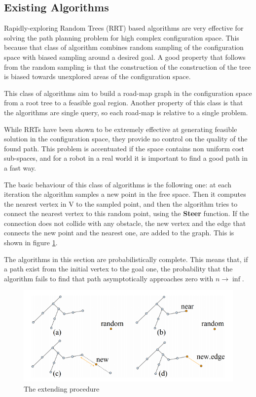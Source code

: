 \documentclass[10pt]{article}
\begin{document}
	\subsection{Existing Algorithms}

	Rapidly-exploring Random Trees (RRT) based algorithms are very effective for solving the path planning problem for high complex configuration space. This because that class of algorithm combines random sampling of the configuration space with biased sampling around a desired goal. A good property that follows from the random sampling is that the construction of the construction of the tree is biased towards unexplored areas of the configuration space.
	
	This class of algorithms aim to build a road-map graph in the configuration space from a root tree to a feasible goal region. Another property of this class is that the algorithms are single query, so each road-map is relative to a single problem. 
	
	While RRTs have been shown to be extremely effective at generating feasible solution in the configuration space, they provide no control on the quality of the found path. This problem is accentuated if the space contains non uniform cost sub-spaces, and for a robot in a real world it is important to find a good path in a fast way.
	
	The basic behaviour of this class of algorithms is the following one: at each iteration the algorithm samples a new point in the free space. Then it computes the nearest vertex in V to the sampled point, and then the algorithm tries to connect the nearest vertex to this random point, using the \textbf{Steer} function. If the connection does not collide with any obstacle, the new vertex and the edge that connects the new point and the nearest one, are added to the graph. This is shown in figure \ref{fig:extension}.
	
		
	The algorithms in this section are probabilistically complete. This means that, if a path exist from the initial vertex to the goal one, the probability that the algorithm fails to find that path asymptotically approaches zero with $n \rightarrow \inf$. 
	
	
	\FloatBarrier
	\begin{figure}[bht]
		\centering
		\includegraphics[width=0.8\linewidth]{rrtExt.png}
		\caption{The extending procedure}
		\label{fig:extension}
	\end{figure}
\FloatBarrier
\newpage
\end{document}
